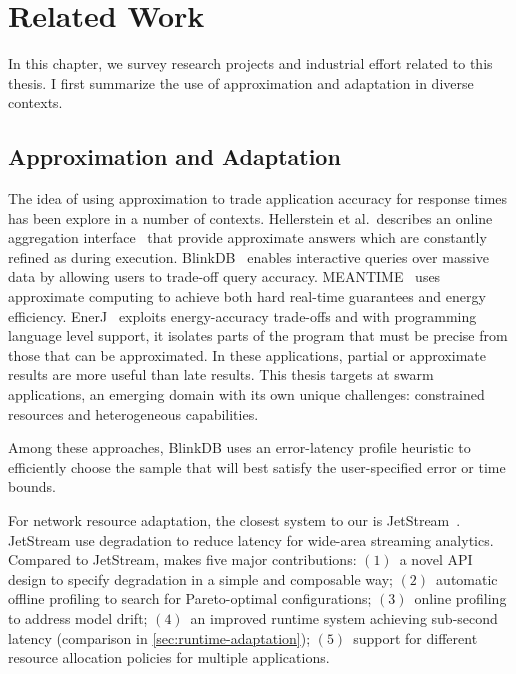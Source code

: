 \documentclass[thesis.tex]{subfiles}
\begin{document}
\chapter{Related Work}
\label{cha:related-work}

In this chapter, we survey research projects and industrial effort related to
this thesis. I first summarize the use of approximation and adaptation in
diverse contexts.

\section{Approximation and Adaptation}
\label{sec:appr-adapt}

The idea of using approximation to trade application accuracy for response times
has been explore in a number of contexts. Hellerstein et al.\, describes an
online aggregation interface~\cite{hellerstein1997online} that provide
approximate answers which are constantly refined as during
execution. BlinkDB~\cite{agarwal2013blinkdb} enables interactive queries over
massive data by allowing users to trade-off query
accuracy. MEANTIME~\cite{farrell2016meantime} uses approximate computing to
achieve both hard real-time guarantees and energy
efficiency. EnerJ~\cite{sampson2011enerj} exploits energy-accuracy trade-offs
and with programming language level support, it isolates parts of the program
that must be precise from those that can be approximated. In these applications,
partial or approximate results are more useful than late results. This thesis
targets at swarm applications, an emerging domain with its own unique
challenges: constrained resources and heterogeneous capabilities.


Among these approaches, BlinkDB uses an error-latency profile heuristic to
efficiently choose the sample that will best satisfy the user-specified error or
time bounds.

For network resource adaptation, the closest system to our \awstream{} is
JetStream~\cite{rabkin2014aggregation}. JetStream use degradation to reduce
latency for wide-area streaming analytics. Compared to JetStream, \awstream{}
makes five major contributions: $(1)$~a novel API design to specify degradation
in a simple and composable way; $(2)$~automatic offline profiling to search for
Pareto-optimal configurations; $(3)$~online profiling to address model drift;
$(4)$~an improved runtime system achieving sub-second latency (comparison in
\autoref{sec:runtime-adaptation}); $(5)$~support for different resource
allocation policies for multiple applications.
\end{document}
